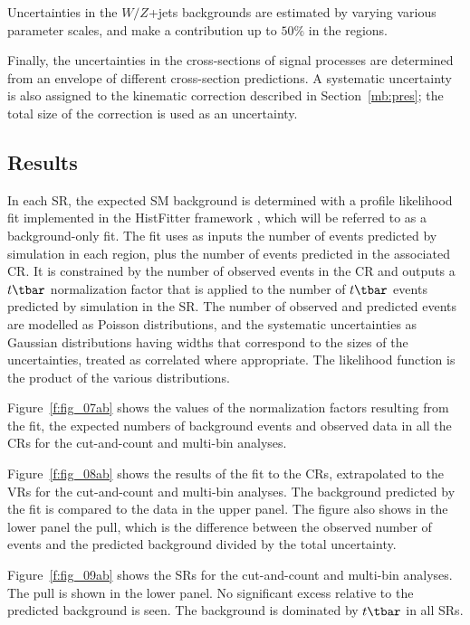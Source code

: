 Uncertainties in the $W/Z$+jets backgrounds are estimated by varying various
parameter scales, and make a contribution up to $50\%$ in the regions.

Finally, the uncertainties in the cross-sections of signal processes are
determined from an envelope of different cross-section predictions. A
systematic uncertainty is also assigned to the kinematic correction described
in Section~\ref{mb:pres}; the total size of the correction is used as an
uncertainty.

\subsection{Results}\label{mbresul}

In each SR, the expected SM background is determined with a profile likelihood
fit \cite{Cowan:2010js} implemented in the HistFitter framework \cite{HFpaper},
which will be referred to as a background-only fit. The fit uses as inputs the
number of events predicted by simulation in each region, plus the number of
events predicted in the associated CR. It is constrained by the number of
observed events in the CR and outputs a $t\tbar$ normalization factor that is
applied to the number of $t\tbar$ events predicted by simulation in the SR. The
number of observed and predicted events are modelled as Poisson distributions,
and the systematic uncertainties as Gaussian distributions having widths that
correspond to the sizes of the uncertainties, treated as correlated where
appropriate. The likelihood function is the product of the various
distributions.

Figure~\ref{f:fig_07ab} shows the values of the normalization factors resulting
from the fit, the expected numbers of background events and observed data in
all the CRs for the cut-and-count and multi-bin analyses.

Figure~\ref{f:fig_08ab} shows the results of the fit to the CRs, extrapolated
to the VRs for the cut-and-count and multi-bin analyses. The background
predicted by the fit is compared to the data in the upper panel. The figure
also shows in the lower panel the pull, which is the difference between the
observed number of events and the predicted background divided by the total
uncertainty.

Figure~\ref{f:fig_09ab} shows the SRs for the cut-and-count and multi-bin
analyses. The pull is shown in the lower panel. No significant excess relative
to the predicted background is seen. The background is dominated by $t\tbar$ in
all SRs.

